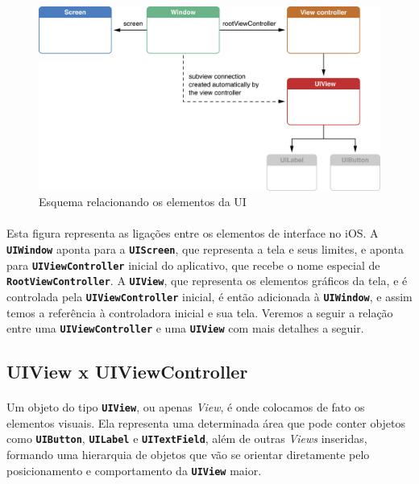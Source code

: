\documentclass[a4paper,12pt,brazil,doubleside]{book}
\begin{document}
\begin{singlespace}
\begin{figure}[H]
  \centering
  \includegraphics[totalheight=0.35\textheight]{figuras/apple_window_view_controller_screen.png}
  \caption{Esquema relacionando os elementos da UI}
  \label{fig:a}
\end{figure}

\bigskip

\paragraph{}Esta figura representa as ligações entre os elementos de interface no iOS. A \texttt{\textbf{UIWindow}} aponta para a \texttt{\textbf{UIScreen}}, que representa a tela e seus limites, e aponta para  \texttt{\textbf{UIViewController}} inicial do aplicativo, que recebe o nome especial de \texttt{\textbf{RootViewController}}. A \texttt{\textbf{UIView}}, que representa os elementos gráficos da tela, e é controlada pela \texttt{\textbf{UIViewController}} inicial, é então adicionada à \texttt{\textbf{UIWindow}}, e assim temos a referência à controladora inicial e sua tela. Veremos a seguir a relação entre uma \texttt{\textbf{UIViewController}} e uma \texttt{\textbf{UIView}} com mais detalhes a seguir.

\bigskip

\subsection{UIView x UIViewController}

\paragraph{}Um objeto do tipo \texttt{\textbf{UIView}}, ou apenas \emph{View}, é onde colocamos de fato os elementos visuais. Ela representa uma determinada área que pode conter objetos como \texttt{\textbf{UIButton}}, \texttt{\textbf{UILabel}} e \texttt{\textbf{UITextField}}, além de outras \emph{Views} inseridas, formando uma hierarquia de objetos que vão se orientar diretamente pelo posicionamento e comportamento da \texttt{\textbf{UIView}} maior.

\end{singlespace}
\end{document}
